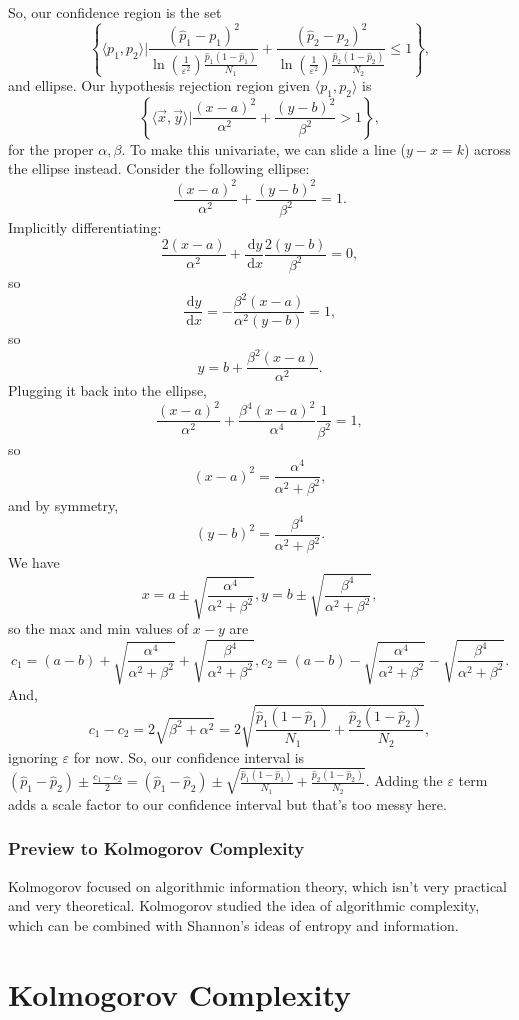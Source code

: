 \documentclass[12pt]{article}
\theoremstyle{remark}
\newcommand{\diffn}[1]{\,\mathrm{d}{#1}}
\newcommand{\fdiffn}[2]{\frac{\diffn{#1}}{\diffn{#2}}}
\begin{document}
So, our confidence region is the set
\[\left\{\langle p_1,p_2\rangle\Bigg\vert\frac{(\hat p_1-p_1)^2}{\ln\left(\frac{1}{\varepsilon^2}\right)\frac{\hat p_1(1-\hat p_1)}{N_1}}+\frac{(\hat p_2-p_2)^2}{\ln\left(\frac{1}{\varepsilon^2}\right)\frac{\hat p_2(1-\hat p_2)}{N_2}}\le 1\right\},\] and ellipse.
Our hypothesis rejection region given $\langle p_1,p_2\rangle$ is
\[\left\{\langle\vec{x},\vec{y}\rangle\bigg|\frac{(x-a)^2}{\alpha^2}+\frac{(y-b)^2}{\beta^2}>1 \right\},\] for the proper $\alpha,\beta.$ To make this univariate, we can slide a line ($y-x=k$) across the ellipse instead. Consider the following ellipse:
\[\frac{(x-a)^2}{\alpha^2}+\frac{(y-b)^2}{\beta^2}=1.\] Implicitly differentiating:
\[\frac{2(x-a)}{\alpha^2}+\fdiffn{y}{x}\frac{2(y-b)}{\beta^2}=0,\] so
\[\fdiffn{y}{x}=-\frac{\beta^2(x-a)}{\alpha^2(y-b)}=1,\] so
\[y=b+\frac{\beta^2(x-a)}{\alpha^2}.\] Plugging it back into the ellipse,
\[\frac{(x-a)^2}{\alpha^2}+\frac{\beta^4(x-a)^2}{\alpha^4}\frac{1}{\beta^2}=1,\] so
\[(x-a)^2=\frac{\alpha^4}{\alpha^2+\beta^2},\] and by symmetry,
\[(y-b)^2=\frac{\beta^4}{\alpha^2+\beta^2}.\]
We have
\[x=a\pm\sqrt{\frac{\alpha^4}{\alpha^2+\beta^2}},y=b\pm\sqrt{\frac{\beta^4}{\alpha^2+\beta^2}},\] so the max and min values of $x-y$ are
\[c_1=(a-b)+\sqrt{\frac{\alpha^4}{\alpha^2+\beta^2}}+\sqrt{\frac{\beta^4}{\alpha^2+\beta^2}},c_2=(a-b)-\sqrt{\frac{\alpha^4}{\alpha^2+\beta^2}}-\sqrt{\frac{\beta^4}{\alpha^2+\beta^2}}.\]
And,
\[c_1-c_2=2\sqrt{\beta^2+\alpha^2}=2\sqrt{\frac{\hat p_1(1-\hat p_1)}{N_1}+\frac{\hat p_2(1-\hat p_2)}{N_2}},\] ignoring $\varepsilon$ for now.
So, our confidence interval is $(\hat p_1-\hat p_2)\pm\frac{c_1-c_2}{2}=(\hat p_1-\hat p_2)\pm\sqrt{\frac{\hat p_1(1-\hat p_1)}{N_1}+\frac{\hat p_2(1-\hat p_2)}{N_2}}.$ Adding the $\varepsilon$ term adds a scale factor to our confidence interval but that's too messy here.
\subsubsection{Preview to Kolmogorov Complexity}
Kolmogorov focused on algorithmic information theory, which isn't very practical and very theoretical. Kolmogorov studied the idea of algorithmic complexity, which can be combined with Shannon's ideas of entropy and information.
\section{Kolmogorov Complexity}
\end{document}
